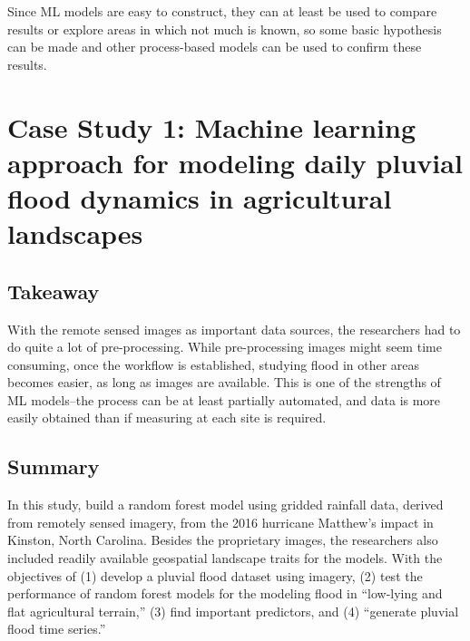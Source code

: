 \documentclass[
]{book}
\begin{document}
Since ML models are easy to construct, they can at least be used to compare results or explore areas in which not much is known, so some basic hypothesis can be made and other process-based models can be used to confirm these results.

\hypertarget{case-study-1-machine-learning-approach-for-modeling-daily-pluvial-flood-dynamics-in-agricultural-landscapes}{%
\section{Case Study 1: Machine learning approach for modeling daily pluvial flood dynamics in agricultural landscapes}\label{case-study-1-machine-learning-approach-for-modeling-daily-pluvial-flood-dynamics-in-agricultural-landscapes}}

\hypertarget{takeaway}{%
\subsection{Takeaway}\label{takeaway}}

With the remote sensed images as important data sources, the researchers had to do quite a lot of pre-processing. While pre-processing images might seem time consuming, once the workflow is established, studying flood in other areas becomes easier, as long as images are available. This is one of the strengths of ML models--the process can be at least partially automated, and data is more easily obtained than if measuring at each site is required.

\hypertarget{summary}{%
\subsection{Summary}\label{summary}}

In this study, \citet{fidan2023} build a random forest model using gridded rainfall data, derived from remotely sensed imagery, from the 2016 hurricane Matthew's impact in Kinston, North Carolina. Besides the proprietary images, the researchers also included readily available geospatial landscape traits for the models. With the objectives of (1) develop a pluvial flood dataset using imagery, (2) test the performance of random forest models for the modeling flood in ``low-lying and flat agricultural terrain,'' (3) find important predictors, and (4) ``generate pluvial flood time series.''
\end{document}
